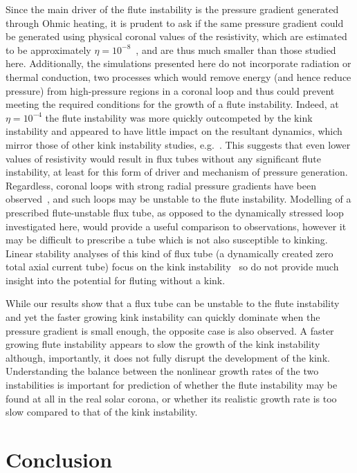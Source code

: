 \documentclass[fleqn,usenatbib]{mnras}
\begin{document}
Since the main driver of the flute instability is the
pressure gradient generated through Ohmic heating, it is prudent to
ask if the same pressure gradient could be generated using physical
coronal values of the resistivity, which are estimated to be
approximately
$\eta=10^{-8}$~\citep{craigAnisotropicViscousDissipation2009a},
and are thus much smaller than those studied
here. Additionally, the simulations presented here do not incorporate
radiation or thermal conduction, two processes which would remove
energy (and hence reduce pressure) from high-pressure regions in a coronal
loop and thus could prevent meeting the required
conditions for the growth of a 
flute instability. Indeed, at $\eta=10^{-4}$ the
flute instability was more quickly outcompeted by the kink
instability and appeared to have little impact on the resultant
dynamics, which mirror those of other kink instability studies, e.g.~\citep{hoodCoronalHeatingMagnetic2009}. This suggests that even
lower values of resistivity would result in flux tubes without any
significant flute instability, at least for this form of
driver and mechanism of pressure generation. Regardless, coronal loops
with strong radial pressure gradients have been
observed~\citep{foukalTemperatureStructurePressure1975}, and such loops
may be unstable to the flute instability. Modelling of a
prescribed flute-unstable flux tube, as opposed to the dynamically
stressed loop investigated here, would provide a useful comparison to
observations, however it may be difficult to prescribe a tube which is
not also susceptible to kinking. Linear stability analyses of this
kind of flux tube (a dynamically created zero total axial current
tube) focus on the kink
instability~\citep{browningSolarCoronalHeating2003b} so do not provide
much insight into the potential for fluting without a kink. 

While our results show that a flux tube can be unstable to
the flute instability and yet the faster growing kink
instability can quickly dominate when the pressure gradient is small
enough, the opposite case is also observed. A faster growing flute instability appears to slow the growth of
the kink instability although, importantly, it does not fully disrupt
the development of the kink. Understanding the balance between the
nonlinear growth rates of the two instabilities is important for prediction of whether the flute instability may be found
at all in the real solar corona, or whether its realistic growth rate is
too slow compared to that of the kink instability. 

\section{Conclusion}
\label{sec-conclusions}
\end{document}

